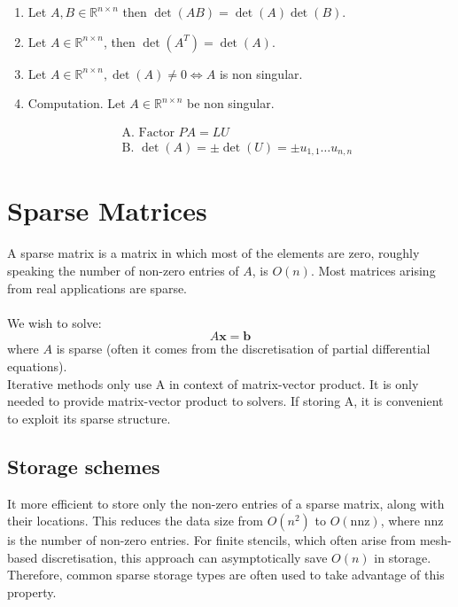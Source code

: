 \documentclass[11pt]{book}
\begin{document}
\begin{enumerate}
  \item Let $A, B \in \mathbb{R}^{n \times n}$ then $\operatorname{det}(A B)=\operatorname{det}(A) \operatorname{det}(B)$.

  \item Let $A \in \mathbb{R}^{n \times n}$, then $\operatorname{det}\left(A^{T}\right)=\operatorname{det}(A)$.

  \item Let $A \in \mathbb{R}^{n \times n}, \operatorname{det}(A) \neq 0 \Longleftrightarrow A$ is non singular.

  \item Computation. Let $A \in \mathbb{R}^{n \times n}$ be non singular.

\end{enumerate}

$$
\begin{aligned}
& \text { A. Factor } P A=L U \\
& \text { B. } \operatorname{det}(A)= \pm \operatorname{det}(U)= \pm u_{1,1} \ldots u_{n, n}
\end{aligned}
$$

\section*{Sparse Matrices}
A sparse matrix is a matrix in which most of the elements are zero, 
roughly speaking the number of non-zero entries of $A$, is $O(n)$.
Most matrices arising from real applications are sparse.\\ \\
We wish to solve:
$$
A \mathbf{x}=\mathbf{b}
$$
where $A$ is sparse (often it comes from the discretisation of partial differential equations).\\ 
Iterative methods only use A in context of matrix-vector product. It is only needed  to provide matrix-vector product to solvers. If storing A, it is convenient to exploit its sparse structure.


\subsection*{Storage schemes}

It more efficient to store only the non-zero entries of a sparse matrix, along with their locations. This reduces the data size from $O\left(n^{2}\right)$ to $O(\mathrm{nnz})$, where $\mathrm{nnz}$ is the number of non-zero entries. For finite stencils, which often arise from mesh-based discretisation, this approach can asymptotically save $O(n)$ in storage. Therefore, common sparse storage types are often used to take advantage of this property.
\end{document}
